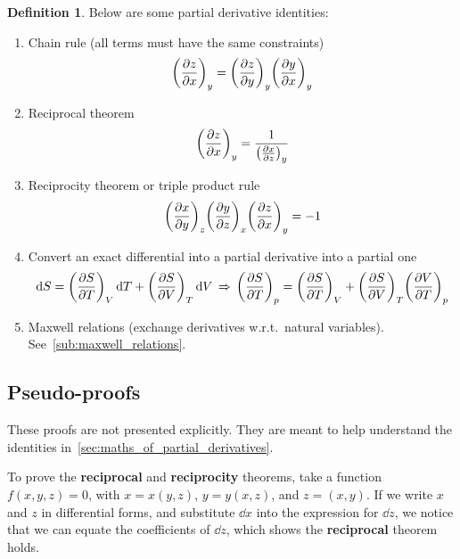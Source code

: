 \documentclass[12pt,chapterprefix=false,dvipsnames]{scrbook}
\theoremstyle{dotless}
\theoremstyle{definition}
\newtheorem{protodefinition}{Definition}[section]
\newenvironment{definition}
{\colorlet{shadecolor}{black!15}\begin{shaded}\begin{protodefinition}}
			{\end{protodefinition}\end{shaded}}
\begin{document}
\begin{definition}
	Below are some partial derivative identities:
	\begin{enumerate}
		\item Chain rule (all terms must have the same constraints)
		      \begin{equation}
			      {\left(\pdv{z}{x}\right)}_y ={\left(\pdv{z}{y}\right)}_y {\left(\pdv{y}{x}\right)}_y
		      \end{equation}
		\item Reciprocal theorem
		      \begin{equation}
			      {\left(\pdv{z}{x}\right)}_y = \frac{1}{{\left(\pdv{x}{z}\right)}_y}
		      \end{equation}
		\item Reciprocity theorem or triple product rule
		      \begin{equation}
			      {\left(\pdv{x}{y}\right)}_z	     {\left(\pdv{y}{z}\right)}_x
			      {\left(\pdv{z}{x}\right)}_y	      = -1
		      \end{equation}
		\item Convert an exact differential into a partial derivative into a
		      partial one
		      \begin{equation}
			      \dd{S} =
			      {\left(\pdv{S}{T}\right)}_V\dd{T} +
			      {\left(\pdv{S}{V}\right)}_T\dd{V}
			      \,\Rightarrow\,
			      {\left(\pdv{S}{T}\right)}_p
				      = {\left(\pdv{S}{T}\right)}_V +
			      {\left(\pdv{S}{V}\right)}_T
			      {\left(\pdv{V}{T}\right)}_p
		      \end{equation}
		\item Maxwell relations (exchange derivatives w.r.t.\ natural
		      variables). See~\ref{sub:maxwell_relations}.
	\end{enumerate}
\end{definition}

\subsection{Pseudo-proofs}%
\label{sub:pseudo_proofs}

These proofs are not presented explicitly. They are meant to
help understand the identities in~\ref{sec:maths_of_partial_derivatives}.

To prove the \textbf{reciprocal} and
\textbf{reciprocity} theorems, take a function
$f(x,y,z) = 0$, with $x = x(y,z)$,
$y = y(x,z)$, and $z = (x,y)$. If we
write $x$ and $z$ in
differential forms, and substitute $\dd{x}$ into
the expression for $\dd{z}$, we notice that we
can equate the coefficients of $\dd{z}$, which
shows the \textbf{reciprocal} theorem holds.
\end{document}
